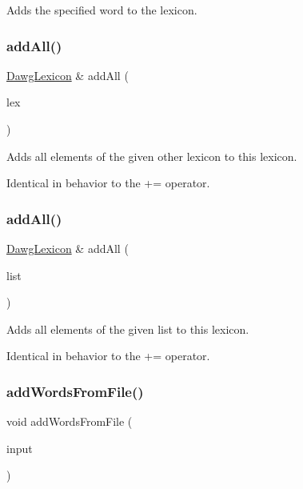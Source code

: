 Adds the specified word to the lexicon. 

\mbox{\label{classDawgLexicon_abcb16967ab02dd1106a92f2a93d8a13c}} 
\subsubsection{\texorpdfstring{add\+All()}{addAll()}\hspace{0.1cm}{\footnotesize\ttfamily [1/2]}}
{\footnotesize\ttfamily \mbox{\hyperlink{classDawgLexicon}{Dawg\+Lexicon}} \& add\+All (\begin{DoxyParamCaption}\item[{const \mbox{\hyperlink{classDawgLexicon}{Dawg\+Lexicon}} \&}]{lex }\end{DoxyParamCaption})}



Adds all elements of the given other lexicon to this lexicon. 

Identical in behavior to the += operator. \mbox{\label{classDawgLexicon_a3f7e696b6fee0d99db3f27619aa559b9}} 
\subsubsection{\texorpdfstring{add\+All()}{addAll()}\hspace{0.1cm}{\footnotesize\ttfamily [2/2]}}
{\footnotesize\ttfamily \mbox{\hyperlink{classDawgLexicon}{Dawg\+Lexicon}} \& add\+All (\begin{DoxyParamCaption}\item[{std\+::initializer\+\_\+list$<$ std\+::string $>$}]{list }\end{DoxyParamCaption})}



Adds all elements of the given list to this lexicon. 

Identical in behavior to the += operator. \mbox{\label{classDawgLexicon_a215fcead487aace2e89b04863e326ba6}} 
\subsubsection{\texorpdfstring{add\+Words\+From\+File()}{addWordsFromFile()}\hspace{0.1cm}{\footnotesize\ttfamily [1/2]}}
{\footnotesize\ttfamily void add\+Words\+From\+File (\begin{DoxyParamCaption}\item[{std\+::istream \&}]{input }\end{DoxyParamCaption})}



